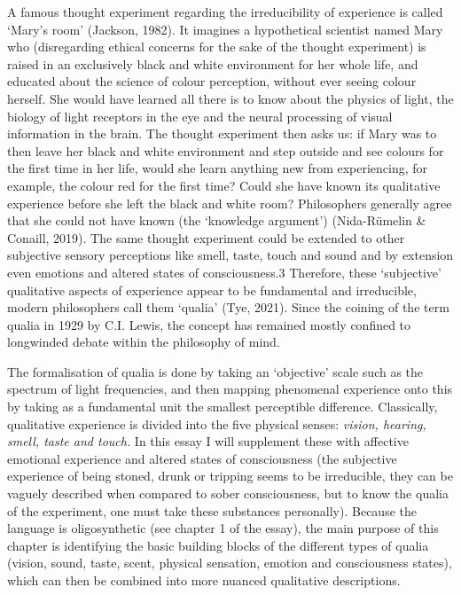 A famous thought experiment regarding the irreducibility of experience is called ‘Mary’s room’ (Jackson, 1982). It imagines a hypothetical scientist named Mary who (disregarding ethical concerns for the sake of the thought experiment) is raised in an exclusively black and white environment for her whole life, and educated about the science of colour perception, without ever seeing colour herself. She would have learned all there is to know about the physics of light, the biology of light receptors in the eye and the neural processing of visual information in the brain. The thought experiment then asks us: if Mary was to then leave her black and white environment and step outside and see colours for the first time in her life, would she learn anything new from experiencing, for example, the colour red for the first time? Could she have known its qualitative experience before she left the black and white room? Philosophers generally agree that she could not have known (the ‘knowledge argument’) (Nida-Rümelin \& Conaill, 2019). The same thought experiment could be extended to other subjective sensory perceptions like smell, taste, touch and sound and by extension even emotions and altered states of consciousness.3 Therefore, these ‘subjective’ qualitative aspects of experience appear to be fundamental and irreducible, modern philosophers call them ‘qualia’ (Tye, 2021). Since the coining of the term qualia in 1929 by C.I. Lewis, the concept has remained mostly confined to longwinded debate within the philosophy of mind.  

The formalisation of qualia is done by taking an ‘objective’ scale such as the spectrum of light frequencies, and then mapping phenomenal experience onto this by taking as a fundamental unit the smallest perceptible difference. Classically, qualitative experience is divided into the five physical senses: \textit{vision, hearing, smell, taste and touch.} In this essay I will supplement these with affective emotional experience and altered states of consciousness (the subjective experience of being stoned, drunk or tripping seems to be irreducible, they can be vaguely described when compared to sober consciousness, but to know the qualia of the experiment, one must take these substances personally). Because the language is oligosynthetic (see chapter 1 of the essay), the main purpose of this chapter is identifying the basic building blocks of the different types of qualia (vision, sound, taste, scent, physical sensation, emotion and consciousness states), which can then be combined into more nuanced qualitative descriptions.

